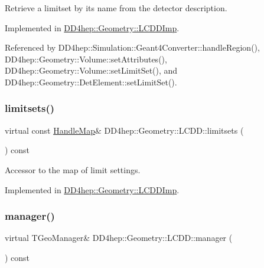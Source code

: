 Retrieve a limitset by it\textquotesingle{}s name from the detector description. 



Implemented in \hyperlink{class_d_d4hep_1_1_geometry_1_1_l_c_d_d_imp_a3736cb6b91d8cbc0f72f6fca88cfa8dd}{D\+D4hep\+::\+Geometry\+::\+L\+C\+D\+D\+Imp}.



Referenced by D\+D4hep\+::\+Simulation\+::\+Geant4\+Converter\+::handle\+Region(), D\+D4hep\+::\+Geometry\+::\+Volume\+::set\+Attributes(), D\+D4hep\+::\+Geometry\+::\+Volume\+::set\+Limit\+Set(), and D\+D4hep\+::\+Geometry\+::\+Det\+Element\+::set\+Limit\+Set().

\hypertarget{class_d_d4hep_1_1_geometry_1_1_l_c_d_d_aeacdfb972606fef31bc1b69e6e982956}{}\label{class_d_d4hep_1_1_geometry_1_1_l_c_d_d_aeacdfb972606fef31bc1b69e6e982956} 
\subsubsection{\texorpdfstring{limitsets()}{limitsets()}}
{\footnotesize\ttfamily virtual const \hyperlink{class_d_d4hep_1_1_geometry_1_1_l_c_d_d_a05cb11e7355772c7b0794bcca59bf477}{Handle\+Map}\& D\+D4hep\+::\+Geometry\+::\+L\+C\+D\+D\+::limitsets (\begin{DoxyParamCaption}{ }\end{DoxyParamCaption}) const\hspace{0.3cm}{\ttfamily [pure virtual]}}



Accessor to the map of limit settings. 



Implemented in \hyperlink{class_d_d4hep_1_1_geometry_1_1_l_c_d_d_imp_a008349bcbcd8e079b14dfde20b88ebad}{D\+D4hep\+::\+Geometry\+::\+L\+C\+D\+D\+Imp}.

\hypertarget{class_d_d4hep_1_1_geometry_1_1_l_c_d_d_af209f1ecaad7336e14ffee002215aa93}{}\label{class_d_d4hep_1_1_geometry_1_1_l_c_d_d_af209f1ecaad7336e14ffee002215aa93} 
\subsubsection{\texorpdfstring{manager()}{manager()}}
{\footnotesize\ttfamily virtual T\+Geo\+Manager\& D\+D4hep\+::\+Geometry\+::\+L\+C\+D\+D\+::manager (\begin{DoxyParamCaption}{ }\end{DoxyParamCaption}) const\hspace{0.3cm}{\ttfamily [pure virtual]}}



